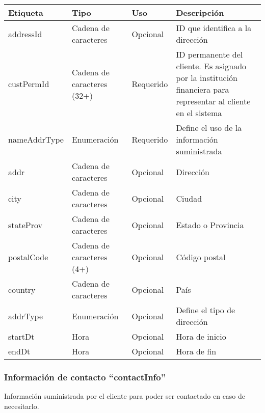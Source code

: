 \begin{center}
\begin{longtable}{|>{\centering\arraybackslash}p{}|>{\centering\arraybackslash}p{}|>{\centering\arraybackslash}p{}|>{\centering\arraybackslash}p{}|}
\hline 
\bfseries {Etiqueta} & \bfseries {Tipo} & \bfseries {Uso} & \bfseries {Descripción} \\ 
\hline 
addressId & Cadena de caracteres & Opcional & ID que identifica a la dirección \\ 
\hline 
custPermId & Cadena de caracteres (32+) & Requerido & ID permanente del cliente. Es asignado por la institución financiera para representar al cliente en el sistema \\
\hline 
nameAddrType & Enumeración & Requerido & Define el uso de la información suministrada \\ 
\hline 
addr & Cadena de caracteres & Opcional & Dirección \\ 
\hline
city & Cadena de caracteres & Opcional & Ciudad \\ 
\hline
stateProv & Cadena de caracteres & Opcional & Estado o Provincia \\ 
\hline
postalCode &  Cadena de caracteres (4+) & Opcional & Código postal \\ 
\hline
country & Cadena de caracteres & Opcional & País \\ 
\hline
addrType & Enumeración & Opcional & Define el tipo de dirección \\ 
\hline
startDt & Hora & Opcional & Hora de inicio \\ 
\hline
endDt & Hora & Opcional & Hora de fin \\ 
\hline
\end{longtable}
\end{center}

\subsubsection{Información de contacto ``contactInfo''}
Información suministrada por el cliente para poder ser contactado en caso de necesitarlo.

